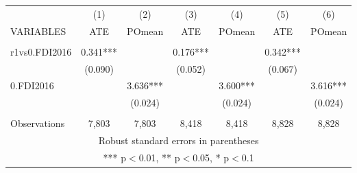 \documentclass[]{article}
\begin{document}
\begin{tabular}{lcccccc} \hline
 & (1) & (2) & (3) & (4) & (5) & (6) \\
VARIABLES & ATE & POmean & ATE & POmean & ATE & POmean \\ \hline
 &  &  &  &  &  &  \\
r1vs0.FDI2016 & 0.341*** &  & 0.176*** &  & 0.342*** &  \\
 & (0.090) &  & (0.052) &  & (0.067) &  \\
0.FDI2016 &  & 3.636*** &  & 3.600*** &  & 3.616*** \\
 &  & (0.024) &  & (0.024) &  & (0.024) \\
 &  &  &  &  &  &  \\
 Observations & 7,803 & 7,803 & 8,418 & 8,418 & 8,828 & 8,828 \\ \hline
\multicolumn{7}{c}{ Robust standard errors in parentheses} \\
\multicolumn{7}{c}{ *** p$<$0.01, ** p$<$0.05, * p$<$0.1} \\
\end{tabular}
\end{document}
